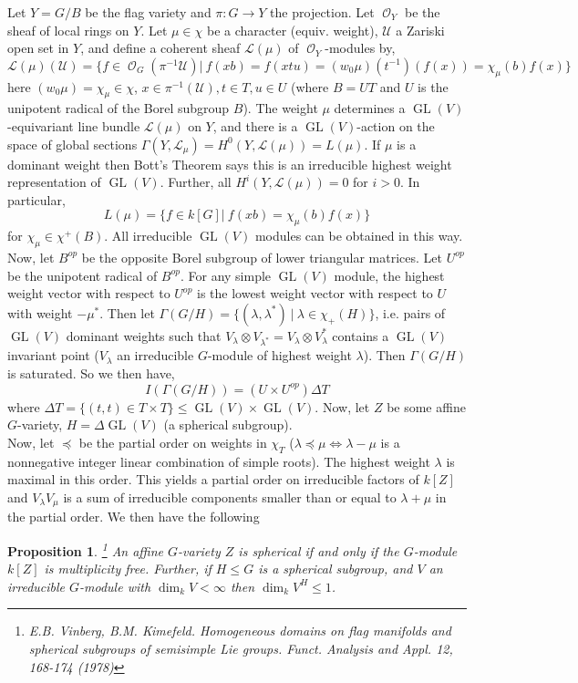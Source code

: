 \documentclass[11pt,oneside]{amsbook}
\numberwithin{equation}{section}
\theoremstyle{plain}
\newtheorem{prop}[theorem]{Proposition}
\theoremstyle{definition}
\theoremstyle{remark}
\newcommand{\sidenote}[1]{\footnote{#1}}
\DeclareMathOperator{\sO}{\mathcal{O}}
\DeclareMathOperator{\GL}{\mathrm{GL}}
\begin{document}
					Let $Y=G/B$ be the flag variety and $\pi:G \to Y$ the projection. Let $\sO_Y$ be the sheaf of local rings on $Y$. Let $\mu \in \chi$ be a character (equiv. weight), $\mathcal{U}$ a Zariski open set in $Y$, and define a coherent sheaf $\mathscr{L}(\mu)$ of $\sO_Y$-modules by,
					\[ \mathscr{L}(\mu)(\mathcal{U}) = \{f \in \sO_G (\pi^{-1}\mathcal{U})| \ f(xb) = f(xtu) = (w_0 \mu)(t^{-1})(f(x)) = \chi_{\mu}(b)f(x) \} \]
					here $(w_0 \mu) = \chi_{\mu} \in \chi$, $x \in \pi^{-1}(\mathcal{U}), t \in T, u \in U$ (where $B=UT$ and $U$ is the unipotent radical of the Borel subgroup $B$). The weight $\mu$ determines a $\GL(V)$-equivariant line bundle $\mathcal{L}(\mu)$ on $Y$, and there is a $\GL(V)$-action on the space of global sections $\Gamma(Y, \mathcal{L}_{\mu}) = H^0(Y, \mathcal{L}(\mu)) = L(\mu)$. If $\mu$ is a dominant weight then Bott's Theorem says this is an irreducible highest weight representation of $\GL(V)$. Further, all $H^i(Y,\mathcal{L}(\mu))=0$ for $i>0$. In particular, 
					\[ L(\mu)=\{f \in k[G]|\ f(xb) = \chi_{\mu}(b)f(x) \} \]
					for $\chi_{\mu} \in \chi^+(B)$. All irreducible $\GL(V)$ modules can be obtained in this way. \\
					Now, let $B^{op}$ be the opposite Borel subgroup of lower triangular matrices. Let $U^{op}$ be the unipotent radical of $B^{op}$. For any simple $\GL(V)$ module, the highest weight vector with respect to $U^{op}$ is the lowest weight vector with respect to $U$ with weight $-\mu^*$.
					Then let $\Gamma(G/H) = \{(\lambda, \lambda^*) \ | \ \lambda \in \chi_+(H) \}$, i.e. pairs of $\GL(V)$ dominant weights such that $V_{\lambda} \otimes V_{\lambda^*} = V_{\lambda} \otimes V^*_{\lambda}$ contains a $\GL(V)$ invariant point ($V_{\lambda}$ an irreducible $G$-module of highest weight $\lambda$). Then $\Gamma(G/H)$ is saturated. So we then have,
					\[ I(\Gamma(G/H)) = (U \times U^{op})\Delta T \]
					where $\Delta T = \{(t,t) \in T \times T\} \leq \GL(V) \times \GL(V)$. Now, let $Z$ be some affine $G$-variety, $H=\Delta \GL(V)$ (a spherical subgroup). \\
					Now, let $\preceq$ be the partial order on weights in $\chi_T$ ($\lambda \preceq \mu \iff \lambda - \mu$ is a nonnegative integer linear combination of simple roots). The highest weight $\lambda$ is maximal in this order. This yields a partial order on irreducible factors of $k[Z]$ and $V_{\lambda}V_{\mu}$ is a sum of irreducible components smaller than or equal to $\lambda+\mu$ in the partial order. We then have the following 
					\begin{prop}\sidenote{E.B. Vinberg, B.M. Kimefeld. \emph{Homogeneous domains on flag manifolds and spherical subgroups of semisimple Lie groups}. Funct. Analysis and Appl. 12, 168-174 (1978)}
						An affine $G$-variety $Z$ is spherical if and only if the $G$-module $k[Z]$ is multiplicity free. Further, if $H \leq G$ is a spherical subgroup, and $V$ an irreducible $G$-module with $\dim_kV < \infty$ then $\dim_kV^H \leq 1$. 
					\end{prop}
\end{document}
